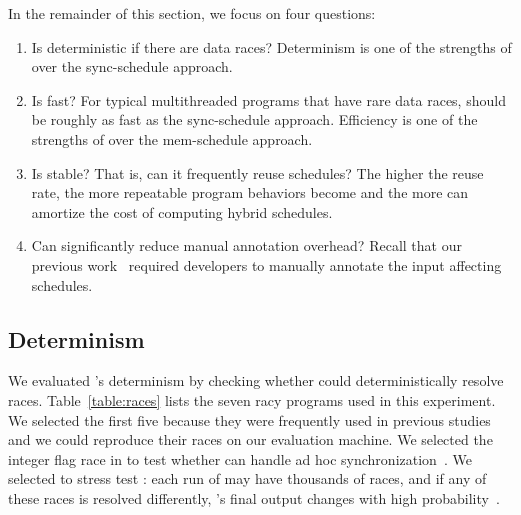 In the remainder of this section, we focus on four questions:
\begin{enumerate}

\item[\S\ref{sec:peregrine-deterministic}:] Is \peregrine deterministic if there are
  data races?  Determinism is one of the strengths of \peregrine over the
  sync-schedule approach.

\item[\S\ref{sec:peregrine-efficient}:] Is \peregrine fast?  For typical multithreaded
  programs that have rare data races, \peregrine should be roughly as fast as
  the sync-schedule approach.  Efficiency is one of the strengths of \peregrine
  over the mem-schedule approach.

\item[\S\ref{sec:peregrine-stable}:] Is \peregrine stable? That is, can it frequently
  reuse schedules?  The higher the reuse
  rate, the more repeatable program behaviors become and the more \peregrine can
  amortize the cost of computing hybrid schedules.

\item[\S\ref{sec:peregrine-annotation}:] Can \peregrine significantly reduce manual
  annotation overhead?  Recall that our previous
  work~\cite{cui:tern:osdi10} required developers to manually annotate the
  input affecting schedules.

\end{enumerate}

\subsection{Determinism} \label{sec:peregrine-deterministic}



We evaluated \peregrine's determinism by checking whether \peregrine could
deterministically resolve races.  Table~\ref{table:races} lists the seven
racy programs used in this experiment.  We selected the first five because
they were frequently used in previous
studies~\cite{avio:asplos06,ctrigger:asplos09,lu:concurrency-bugs,pres:sosp09}
and we could reproduce their races on our evaluation machine.  We selected the
integer flag race in \parsec to test whether \peregrine can handle ad hoc
synchronization~\cite{syncfinder:osdi10}.  We selected \racey to stress
test \peregrine: each run of \racey may have thousands of races, and if any of
these races is resolved differently, \racey's final output changes
with high probability~\cite{racy-stress}.

